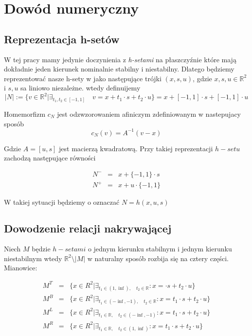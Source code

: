 
\section{Dowód numeryczny}

\subsection{Reprezentacja h-setów}

W tej pracy mamy jedynie doczynienia z {\em h-setami} na płaszczyźnie które mają dokładnie jeden kierunek 
nominalnie stabilny i niestabilny. Dlatego będziemy reprezentować nasze h-sety  w jako następujące trójki 
$ (x,s,u) $, gdzie $x,s,u \in \mathbb R^2 $ i $s,u$ sa liniowo niezależne. wtedy definuijemy 
$$
  |N| := \{v \in \mathbb R^2 | \exists_{t_1,t_2 \in [-1,1]} \quad v = x + t_1 \cdot s + t_2 \cdot u  \}
      = x + [-1,1]\cdot s + [-1,1]\cdot u 
$$

Homemorfizm $ c_N $ jest odzwzorowaniem afiniczym zdefiniowanym w nastepujacy sposób 
$$
  c_N(v) = A^{-1}(v - x) 
$$

Gdzie $ A = [u,s] $ jest macierzą kwadratową. Przy takiej reprezentacji $h-setu$ zachodzą następujące równości

\begin{eqnarray}
  N^- & = & x + \{-1,1\} \cdot s \\
  N^+ & = & x + u \cdot \{-1,1\}  
\end{eqnarray}

W takiej sytuacji będziemy o oznaczać $ N = h(x,u,s) $

\subsection{Dowodzenie relacji nakrywającej}

Niech $ M $ będzie $ h-setami$ o jednym kierunku stabilnym i jednym kierunku niestabilnym wtedy 
$ \mathbb{R}^2 \setminus |M| $ w naturalny 
sposób rozbija się na cztery części. Mianowice:

\begin{eqnarray}
  M^T & = & \{ x \in R^2 | \exists_{ t_1 \in (1,\inf), \quad t_2 \in \mathbb R} : x =  \cdot s + t_2 \cdot u  \} \\
  M^B & = & \{ x \in R^2 | \exists_{ t_1 \in (-\inf, -1), \quad t_2 \in \mathbb R} : x = t_1 \cdot s + t_2 \cdot u  \} \\
  M^L & = & \{ x \in R^2 | \exists_{ t_1 \in \mathbb R, \quad t_2 \in (-\inf,-1)} : x = t_1 \cdot s + t_2 \cdot u  \} \\
  M^R & = & \{ x \in R^2 | \exists_{ t_1 \in \mathbb R, \quad t_2 \in (1,\inf)} : x = t_1 \cdot s + t_2 \cdot u  \} \\
\end{eqnarray}


